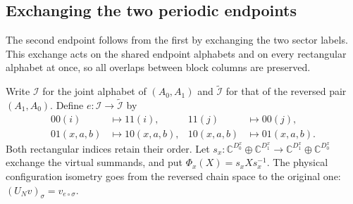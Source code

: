
\subsection{Exchanging the two periodic endpoints}
\label{sec:mpo_joint_periodic_endpoint_swap}

The second endpoint follows from the first by exchanging the two sector
labels. This exchange acts on the shared endpoint alphabets and on every
rectangular alphabet at once, so all overlaps between block columns are
preserved.

\begin{definition}
    \label{def:mpo_joint_endpoint_swap}
    \leanok
    Write $\mathcal I$ for the joint alphabet of $(A_0,A_1)$ and
    $\widetilde{\mathcal I}$ for that of the reversed pair $(A_1,A_0)$.
    Define $e:\mathcal I\longrightarrow\widetilde{\mathcal I}$ by
    \begin{align*}
        00(i)     & \longmapsto11(i),     & 11(j) & \longmapsto00(j), \\
        01(x,a,b) & \longmapsto10(x,a,b), &
        10(x,a,b) & \longmapsto01(x,a,b).
    \end{align*}
    Both rectangular indices retain their order. Let
    $s_x:\mathbb C^{D_0^x}\oplus\mathbb C^{D_1^x}
        \longrightarrow\mathbb C^{D_1^x}\oplus\mathbb C^{D_0^x}$
    exchange the virtual summands, and put
    $\Phi_x(X)=s_xXs_x^{-1}$.
    The physical configuration isometry goes from the reversed chain
    space to the original one:
    $(U_Nv)_\sigma=v_{e\circ\sigma}$.
\end{definition}

